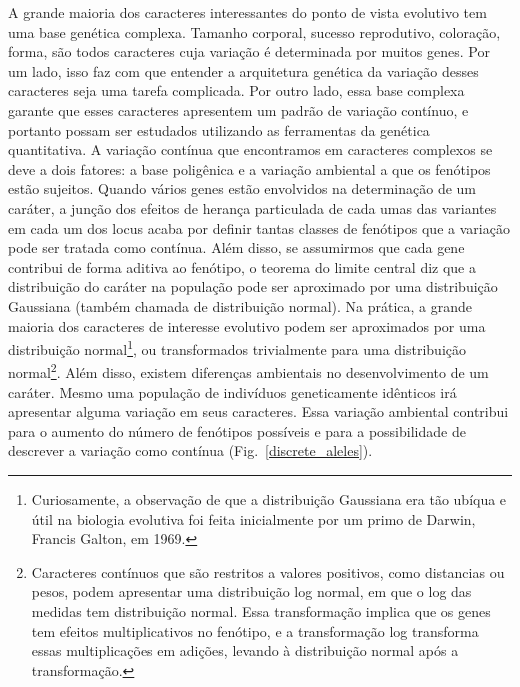 \begin{refsection}
A grande maioria dos caracteres interessantes do ponto de vista evolutivo tem
uma base genética complexa. Tamanho corporal, sucesso reprodutivo, coloração,
forma, são todos caracteres cuja variação é determinada por muitos genes. Por
um lado, isso faz com que entender a arquitetura genética da variação desses
caracteres seja uma tarefa complicada. Por outro lado, essa base complexa
garante que esses caracteres apresentem um padrão de variação contínuo, e
portanto possam ser estudados utilizando as ferramentas da genética
quantitativa. A variação contínua que encontramos em caracteres complexos se
deve a dois fatores: a base poligênica e a variação ambiental a que os
fenótipos estão sujeitos. Quando vários genes estão envolvidos na determinação
de um caráter, a junção dos efeitos de herança particulada de cada umas das
variantes em cada um dos locus acaba por definir tantas classes de fenótipos
que a variação pode ser tratada como contínua. Além disso, se assumirmos que
cada gene contribui de forma aditiva ao fenótipo, o teorema do limite central
diz que a distribuição do caráter na população pode ser aproximado por uma
distribuição Gaussiana (também chamada de distribuição normal). Na prática, a
grande maioria dos caracteres de interesse evolutivo podem ser aproximados por
uma distribuição normal\footnote{Curiosamente, a observação de que a
distribuição Gaussiana era tão ubíqua e útil na biologia evolutiva foi feita
inicialmente por um primo de Darwin, Francis Galton, em 1969.}, ou
transformados trivialmente para uma distribuição normal\footnote{Caracteres
contínuos que são restritos a valores positivos, como distancias ou pesos,
podem apresentar uma distribuição log normal, em que o log das medidas tem
distribuição normal. Essa transformação implica que os genes tem efeitos
multiplicativos no fenótipo, e a transformação log transforma essas
multiplicações em adições, levando à distribuição normal após a
transformação.}. Além disso, existem diferenças ambientais no desenvolvimento
de um caráter. Mesmo uma população de indivíduos geneticamente idênticos irá
apresentar alguma variação em seus caracteres. Essa variação ambiental
contribui para o aumento do número de fenótipos possíveis e para a
possibilidade de descrever a variação como contínua
(Fig.~\ref{discrete_aleles}).


\end{refsection}
